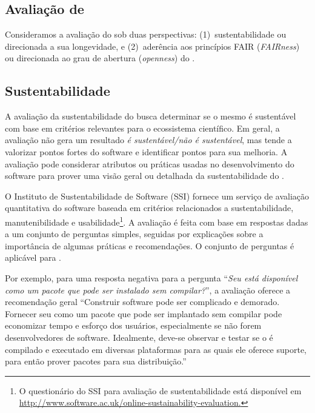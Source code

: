 





\subsection{Avaliação de \RS}

Consideramos a avaliação do \RSw sob duas perspectivas: (1)~sustentabilidade ou direcionada a sua longevidade, e (2)~aderência aos princípios FAIR (\textit{FAIRness}) ou direcionada ao grau de abertura (\textit{openness}) do \RS.


\subsection*{Sustentabilidade}

A avaliação da sustentabilidade do \RSw busca determinar se o mesmo é sustentável com base em critérios relevantes para o ecossistema científico.
Em geral, a avaliação não gera um resultado \textit{é sustentável/não é sustentável}, mas tende a 
valorizar pontos fortes do software e identificar pontos para sua melhoria. A avaliação pode considerar atributos ou práticas usadas no desenvolvimento do software para 
prover uma visão geral ou detalhada da sustentabilidade do \RS.

O Instituto de Sustentabilidade de Software (SSI)
fornece um serviço de avaliação quantitativa do software baseada em critérios relacionados a sustentabilidade, manutenibilidade e usabilidade\footnote{
O questionário do SSI para avaliação de sustentabilidade está disponível em \url{http://www.software.ac.uk/online-sustainability-evaluation.}}.
%
A avaliação é feita com base em respostas dadas a um conjunto
de perguntas simples, seguidas por explicações sobre a importância de algumas práticas e recomendações. 
O conjunto de perguntas é aplicável para \RS.

Por exemplo, para uma resposta negativa para a pergunta 
``\textit{Seu \RSw está disponível como um pacote que pode ser instalado sem compilar?}'', a avaliação oferece a recomendação geral 
``Construir software pode ser complicado e demorado. Fornecer seu \RSw como um pacote que pode ser implantado sem compilar pode economizar tempo e esforço dos usuários, especialmente se não forem desenvolvedores de software. Idealmente, deve-se observar e testar se o \RSw é compilado e executado em diversas plataformas para as quais ele oferece suporte, para então prover pacotes para sua distribuição.'' 

